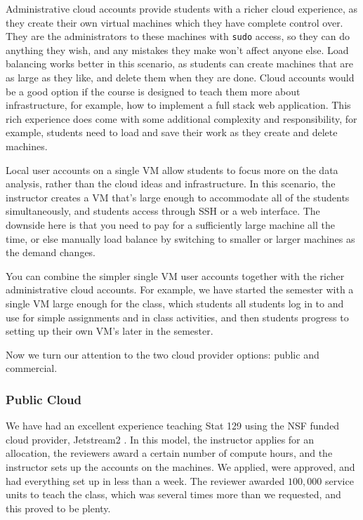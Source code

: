 \documentclass[12pt]{article}
\begin{document}
Administrative cloud accounts provide students with a richer cloud experience, as they create their own virtual machines which they have complete control over.
They are the administrators to these machines with \texttt{sudo} access, so they can do anything they wish, and any mistakes they make won't affect anyone else.
Load balancing works better in this scenario, as students can create machines that are as large as they like, and delete them when they are done.
Cloud accounts would be a good option if the course is designed to teach them more about infrastructure, for example, how to implement a full stack web application.
This rich experience does come with some additional complexity and responsibility, for example, students need to load and save their work as they create and delete machines.

Local user accounts on a single VM allow students to focus more on the data analysis, rather than the cloud ideas and infrastructure.
In this scenario, the instructor creates a VM that's large enough to accommodate all of the students simultaneously, and students access through SSH or a web interface.
The downside here is that you need to pay for a sufficiently large machine all the time, or else manually load balance by switching to smaller or larger machines as the demand changes.

You can combine the simpler single VM user accounts together with the richer administrative cloud accounts.
For example, we have started the semester with a single VM large enough for the class, which students all students log in to and use for simple assignments and in class activities, and then students progress to setting up their own VM's later in the semester.

Now we turn our attention to the two cloud provider options: public and commercial.



\subsubsection{Public Cloud}

We have had an excellent experience teaching Stat 129 using the NSF funded cloud provider, Jetstream2 \cite{hancock2021jetstream2}.
In this model, the instructor applies for an allocation, the reviewers award a certain number of compute hours, and the instructor sets up the accounts on the machines.
We applied, were approved, and had everything set up in less than a week.
The reviewer awarded $100,000$ service units to teach the class, which was several times more than we requested, and this proved to be plenty.
\end{document}
